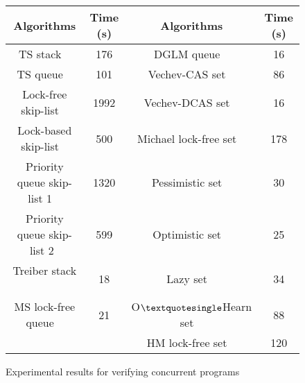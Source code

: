 \begin{figure}[]

\begin{tabular}{|c | c || c | c |}
  \hline
   \textsf{{\textbf{Algorithms}}} &  \textsf{{\textbf{Time (s)}}} & \textsf{{\textbf{Algorithms}}} &  \textsf{{\textbf{Time (s)}}}  \\

\hline
\hline

\textsf{TS stack  ~\cite{MS:QueueAlgorithms}}  & \textsf{176} & \textsf{DGLM queue  ~\cite{Doherty:lockfree}}&  \textsf {16} \\
\hline

\textsf{TS queue  ~\cite{MS:QueueAlgorithms}}& \textsf{101} & \textsf{Vechev-CAS set  ~\cite{Vechev:list}}  & \textsf{86} \\
\hline
\textsf{Lock-free skip-list   ~\cite{ArtOfMpP}}& \textsf{1992} & \textsf{Vechev-DCAS set  ~\cite{Vechev:list}}   & \textsf{16} \\
\hline

\textsf{Lock-based skip-list ~\cite{lockskiplist}}& \textsf{500} & \textsf{Michael lock-free set ~\cite{Michael:list}}  & \textsf{178} \\
\hline
 
\textsf{Priority queue skip-list 1 ~\cite{Shavit:ElimQueue}}  &  \textsf{1320} & \textsf{Pessimistic set  ~\cite{ArtOfMpP}}&\textsf{30}\\
\hline

\textsf{Priority queue skip-list 2~\cite{Linden:opodis13}}  &  \textsf{599} &\textsf{Optimistic set ~\cite{ArtOfMpP}}& \textsf{25}\\
\hline
\textsf{Treiber stack  ~\cite{Treiber:stack}} & \textsf {18} & \textsf{Lazy set ~\cite{Lazyset}  }  & \textsf {34}\\
\hline

\textsf{MS lock-free queue  ~\cite{MS:QueueAlgorithms}}& \textsf{21} & \textsf {O$\textquotesingle $Hearn set  ~\cite{OHearnlist}} & \textsf{88}\\
\hline

&   & \textsf{HM lock-free set  ~\cite{ArtOfMpP} } & \textsf{120}\\
\hline
\end{tabular}

\caption{Experimental results for verifying concurrent programs}
\label{Experiments:fig}
\end{figure}
